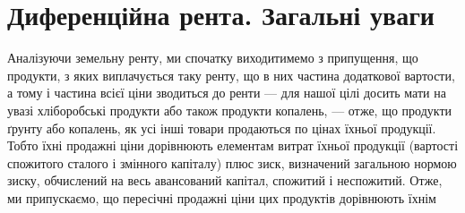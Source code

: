 \section{Диференційна рента. Загальні уваги}

Аналізуючи земельну ренту, ми спочатку виходитимемо з припущення, що
продукти, з яких виплачується таку ренту, що в них частина додаткової вартости,
а тому і частина всієї ціни зводиться до ренти — для нашої цілі досить мати на
увазі хліборобські продукти або також продукти копалень, — отже, що продукти
ґрунту або копалень, як усі інші товари продаються по цінах їхньої продукції.
Тобто їхні продажні ціни дорівнюють елементам витрат їхньої продукції (вартості
спожитого сталого і змінного капіталу) плюс зиск, визначений загальною
нормою зиску, обчислений на весь авансований капітал, спожитий і неспожитий.
Отже, ми припускаємо, що пересічні продажні ціни цих продуктів дорівнюють їхнім
\parbreak{}  %
